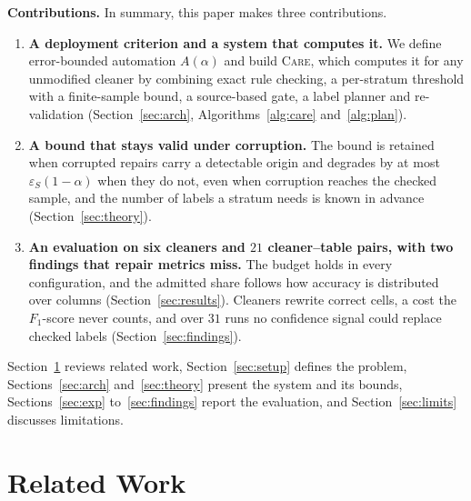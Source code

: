 \documentclass[sigconf, nonacm, balance=false]{acmart}
\theoremstyle{remark}
\newcommand{\nruns}{31}
\begin{document}
\textbf{Contributions.} In summary, this paper makes three contributions.
\begin{enumerate}
\item \textbf{A deployment criterion and a system that computes it.} We define
error-bounded automation $A(\alpha)$ and build \textsc{Care}, which computes it for any
unmodified cleaner by combining exact rule checking, a per-stratum threshold with a
finite-sample bound, a source-based gate, a label planner and re-validation
(Section~\ref{sec:arch}, Algorithms~\ref{alg:care} and~\ref{alg:plan}).
\item \textbf{A bound that stays valid under corruption.} The bound is retained when
corrupted repairs carry a detectable origin and degrades by at most
$\varepsilon_S(1-\alpha)$ when they do not, even when corruption reaches the checked
sample, and the number of labels a stratum needs is known in advance
(Section~\ref{sec:theory}).
\item \textbf{An evaluation on six cleaners and $21$ cleaner--table pairs, with two
findings that repair metrics miss.} The budget holds in every configuration, and the
admitted share follows how accuracy is distributed over columns
(Section~\ref{sec:results}). Cleaners rewrite correct cells, a cost the $F_1$-score
never counts, and over $\nruns$ runs no confidence signal could replace checked labels
(Section~\ref{sec:findings}).
\end{enumerate}
Section~\ref{sec:related} reviews related work, Section~\ref{sec:setup} defines the
problem, Sections~\ref{sec:arch} and~\ref{sec:theory} present the system and its
bounds, Sections~\ref{sec:exp} to~\ref{sec:findings} report the evaluation, and
Section~\ref{sec:limits} discusses limitations.

\section{Related Work}
\label{sec:related}
\end{document}
